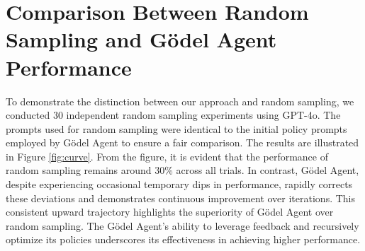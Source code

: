 \documentclass[11pt]{article}
\newcommand{\framework}{Gödel Agent\xspace}
\begin{document}
\section{Comparison Between Random Sampling and \framework Performance}
To demonstrate the distinction between our approach and random sampling, we conducted 30 independent random sampling experiments using GPT-4o. The prompts used for random sampling were identical to the initial policy prompts employed by Gödel Agent to ensure a fair comparison.
The results are illustrated in Figure \ref{fig:curve}. From the figure, it is evident that the performance of random sampling remains around 30\% across all trials. In contrast, Gödel Agent, despite experiencing occasional temporary dips in performance, rapidly corrects these deviations and demonstrates continuous improvement over iterations.
This consistent upward trajectory highlights the superiority of Gödel Agent over random sampling. The Gödel Agent’s ability to leverage feedback and recursively optimize its policies underscores its effectiveness in achieving higher performance.
\end{document}
